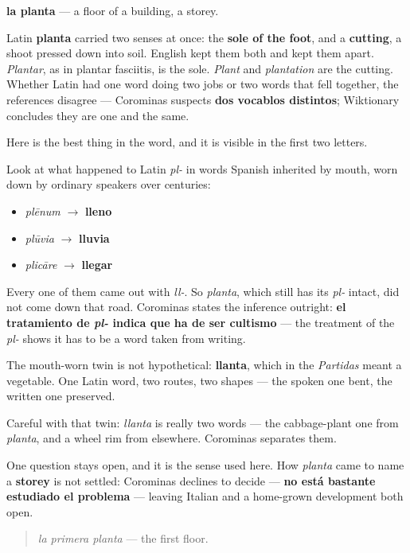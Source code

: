 \begin{cousinweb}
\textbf{la planta} — a floor of a building, a storey.

Latin \textbf{planta} carried two senses at once: the \textbf{sole of the foot}, and a \textbf{cutting}, a shoot pressed down into soil. English kept them both and kept them apart. \emph{Plantar}, as in plantar fasciitis, is the sole. \emph{Plant} and \emph{plantation} are the cutting. Whether Latin had one word doing two jobs or two words that fell together, the references disagree — Corominas suspects \textbf{dos vocablos distintos}; Wiktionary concludes they are one and the same.

Here is the best thing in the word, and it is visible in the first two letters.

Look at what happened to Latin \emph{pl-} in words Spanish inherited by mouth, worn down by ordinary speakers over centuries:

\begin{itemize}
\raggedright
  \item \emph{plēnum} $\to$ \textbf{lleno}
  \item \emph{plūvia} $\to$ \textbf{lluvia}
  \item \emph{plicāre} $\to$ \textbf{llegar}
\end{itemize}

Every one of them came out with \emph{ll-}. So \emph{planta}, which still has its \emph{pl-} intact, did not come down that road. Corominas states the inference outright: \textbf{el tratamiento de \emph{pl-} indica que ha de ser cultismo} — the treatment of the \emph{pl-} shows it has to be a word taken from writing.

The mouth-worn twin is not hypothetical: \textbf{llanta}, which in the \emph{Partidas} meant a vegetable. One Latin word, two routes, two shapes — the spoken one bent, the written one preserved.

Careful with that twin: \emph{llanta} is really two words — the cabbage-plant one from \emph{planta}, and a wheel rim from elsewhere. Corominas separates them.

One question stays open, and it is the sense used here. How \emph{planta} came to name a \textbf{storey} is not settled: Corominas declines to decide — \textbf{no está bastante estudiado el problema} — leaving Italian and a home-grown development both open.

\begin{quote}
\emph{la primera planta} — the first floor.
\end{quote}
\end{cousinweb}

